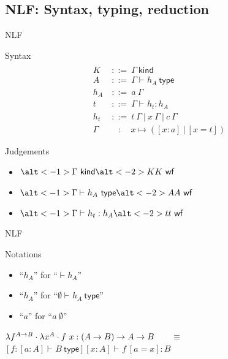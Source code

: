 \documentclass[ignorenonframetext,red]{beamer}
\newcommand\gor{\ |\ }
\newcommand\gequal{\ ::=\ }
\newcommand\postbinder{\cdot}
\newcommand\app[1]{{#1}\ }
\newcommand\tlam[2]{\ensuremath\lambda{#1}^{#2}\postbinder}
\newcommand\lam{\tlam}
\newcommand\eent[1]{\left[{#1}\right]}
\newcommand\econs[2]{{#1}\eent{#2}}
\newcommand\esing[1]{\econs{}{#1}}
\newcommand\jlangt[4]{{#2}\vdash_{\mathrm{#1}}{#3}:{#4}}
\newcommand\jlangA[3]{{#2}\vdash_{\mathrm{#1}}{#3}\mathsf{\ type}}
\newcommand\jlangK[3]{{#2}\vdash_{\mathrm{#1}}{#3}\mathsf{\ kind}}
\newcommand\jnlft[3]{\jlangt{}{#1}{#2}{#3}}
\newcommand\jnlfA[2]{\jlangA{}{#1}{#2}}
\newcommand\jnlfK[1]{{#1}\ \mathsf{kind}} %
\newcommand\jwf[1]{{#1}\ \mathsf{wf}}
\begin{document}
\subsection{NLF: Syntax, typing, reduction}

\begin{frame}{NLF}
  \begin{block}{Syntax}
    \begin{align*}
      \\[-3em]
      K &\gequal \jnlfK\Gamma \\
      A &\gequal \jnlfA\Gamma{h_A} \\
      h_A &\gequal \app a \Gamma \\
      t &\gequal \jnlft\Gamma{h_t}{h_A} \\
      h_t &\gequal \app t\Gamma \gor
      \app x\Gamma \gor \app c\Gamma \\
      \Gamma &\quad :\quad x \mapsto (\eent{x:a} \gor \eent{x=t})
    \end{align*}
  \end{block}
  \begin{overlayarea}{\textwidth}{\textwidth}
    \begin{block}{Judgements}
      \begin{itemize}
      \item $\alt<-1>{\jnlfK\Gamma}{\alt<-2> K {\jwf K}}$
      \item $\alt<-1>{\jnlfA\Gamma{h_A}}{\alt<-2> A {\jwf A}}$
      \item $\alt<-1>{\jnlft\Gamma{h_t}{h_A}}{\alt<-2> t {\jwf t}}$
      \end{itemize}
    \end{block}
  \end{overlayarea}
  \pause\pause
\end{frame}

\begin{frame}{NLF}
  \begin{block}{Notations}
    \begin{itemize}
    \item ``$h_A$'' for ``$\vdash h_A$''
    \item ``$h_A$'' for ``$\jnlfA{\emptyset}{h_A}$''
    \item ``$a$'' for ``$\app a \emptyset$''
    \end{itemize}
  \end{block}
  \begin{example}
    $\lam f {A\to B} \lam x A \app f x : (A\to B)\to A\to B\qquad\equiv$\\[0.5em]
    $\jnlft
    {\econs
      {\eent{f:\jnlfA{\eent{a:A}}{B}}}
      {x:A}}
    {\app f {\esing{a=x}}}
    {B}$
  \end{example}
\end{frame}
\end{document}
